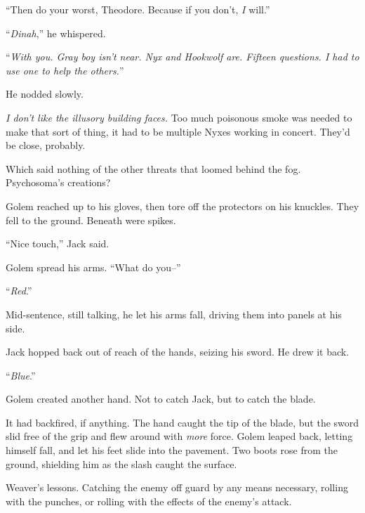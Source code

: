 ``Then do your worst, Theodore.  Because if you don't, \emph{I }will.''



``\emph{Dinah},'' he whispered.



``\emph{With you.  Gray boy isn't near.  Nyx and Hookwolf are.  Fifteen questions.  I had to use one to help the others.}''



He nodded slowly.



\emph{I don't like the illusory building faces.  }Too much poisonous smoke was needed to make that sort of thing, it had to be multiple Nyxes working in concert.  They'd be close, probably.



Which said nothing of the other threats that loomed behind the fog.  Psychosoma's creations?



Golem reached up to his gloves, then tore off the protectors on his knuckles.  They fell to the ground.  Beneath were spikes.



``Nice touch,'' Jack said.



Golem spread his arms.  ``What do you--''



``\emph{Red}.''



Mid-sentence, still talking, he let his arms fall, driving them into panels at his side.



Jack hopped back out of reach of the hands, seizing his sword.  He drew it back.



``\emph{Blue}.''



Golem created another hand.  Not to catch Jack, but to catch the blade.



It had backfired, if anything.  The hand caught the tip of the blade, but the sword slid free of the grip and flew around with \emph{more} force.  Golem leaped back, letting himself fall, and let his feet slide into the pavement.  Two boots rose from the ground, shielding him as the slash caught the surface.



Weaver's lessons.  Catching the enemy off guard by any means necessary, rolling with the punches, or rolling with the effects of the enemy's attack.




